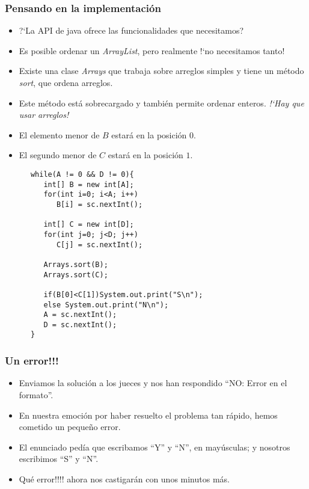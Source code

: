 \documentclass{beamer}
\begin{document}
\begin{frame}
 \frametitle{Pensando en la implementación}
 \begin{itemize}
  \item ?`La API de java ofrece las funcionalidades que necesitamos?
  \item Es posible ordenar un \emph{ArrayList}, pero realmente !`no necesitamos tanto!
  \item Existe una clase \emph{Arrays} que trabaja sobre arreglos simples y tiene un método \emph{sort}, que ordena arreglos.
  \item Este método está sobrecargado y también permite ordenar enteros. \emph{!`Hay que usar arreglos!}
  \item El elemento menor de $B$ estará en la posición $0$.
  \item El segundo menor de $C$ estará en la posición $1$.
 \end{itemize}
\end{frame}

\begin{frame}[fragile]
 \begin{lstlisting}
      while(A != 0 && D != 0){
         int[] B = new int[A];
         for(int i=0; i<A; i++) 
            B[i] = sc.nextInt();

         int[] C = new int[D];
         for(int j=0; j<D; j++) 
            C[j] = sc.nextInt();

         Arrays.sort(B);
         Arrays.sort(C);

         if(B[0]<C[1])System.out.print("S\n");
         else System.out.print("N\n");
         A = sc.nextInt();
         D = sc.nextInt();
      }
 \end{lstlisting}

\end{frame}

\begin{frame}
 \frametitle{Un error!!!}
 \begin{itemize}
  \item Enviamos la solución a los jueces y nos han respondido ``NO: Error en el formato''.
  \item En nuestra emoción por haber resuelto el problema tan rápido, hemos cometido un pequeño error.
  \item El enunciado pedía que escribamos ``Y'' y ``N'', en mayúsculas; y nosotros escribimos ``S'' y ``N''.
  \item Qué error!!!! ahora nos castigarán con unos minutos más.
 \end{itemize}
\end{frame}
\end{document}

